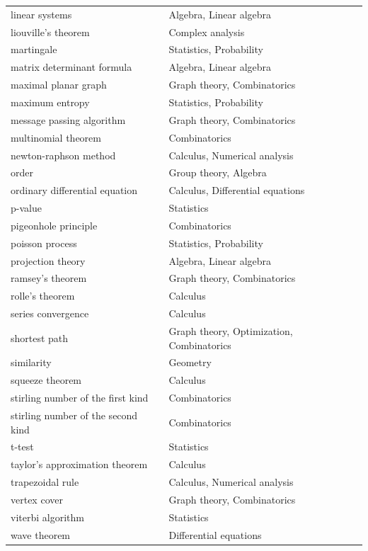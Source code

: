 \begin{table}
\begin{tabular}{ll}
    linear systems & Algebra, Linear algebra \\
    liouville's theorem & Complex analysis \\
    martingale & Statistics, Probability \\
    matrix determinant formula & Algebra, Linear algebra \\
    maximal planar graph & Graph theory, Combinatorics \\
    maximum entropy & Statistics, Probability \\
    message passing algorithm & Graph theory, Combinatorics \\
    multinomial theorem & Combinatorics \\
    newton-raphson method & Calculus, Numerical analysis \\
    order & Group theory, Algebra \\
    ordinary differential equation & Calculus, Differential equations \\
    p-value & Statistics \\
    pigeonhole principle & Combinatorics \\
    poisson process & Statistics, Probability \\
    projection theory & Algebra, Linear algebra \\
    ramsey's theorem & Graph theory, Combinatorics \\
    rolle's theorem & Calculus \\
    series convergence & Calculus \\
    shortest path & Graph theory, Optimization, Combinatorics \\
    similarity & Geometry \\
    squeeze theorem & Calculus \\
    stirling number of the first kind & Combinatorics \\
    stirling number of the second kind & Combinatorics \\
    t-test & Statistics \\
    taylor's approximation theorem & Calculus \\
    trapezoidal rule & Calculus, Numerical analysis \\
    vertex cover & Graph theory, Combinatorics \\
    viterbi algorithm & Statistics \\
    wave theorem & Differential equations \\ \bottomrule
\end{tabular}
\label{tab:camel_topics}
\end{table}